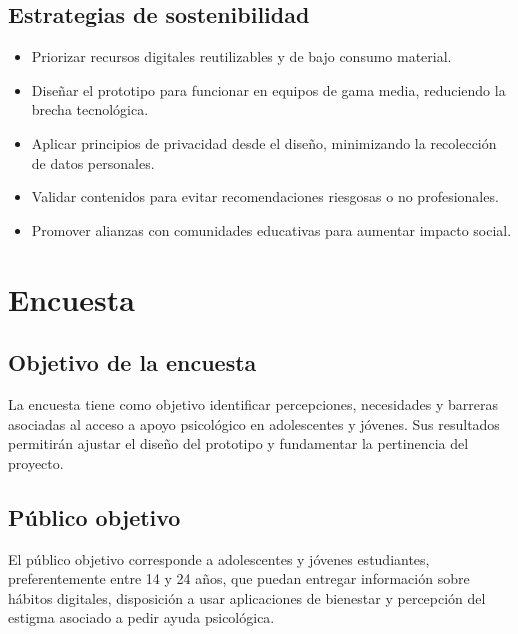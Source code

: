 \documentclass[12pt,letterpaper]{article}
\begin{document}
\subsection{Estrategias de sostenibilidad}
\begin{itemize}[leftmargin=*]
    \item Priorizar recursos digitales reutilizables y de bajo consumo material.
    \item Diseñar el prototipo para funcionar en equipos de gama media, reduciendo la brecha tecnológica.
    \item Aplicar principios de privacidad desde el diseño, minimizando la recolección de datos personales.
    \item Validar contenidos para evitar recomendaciones riesgosas o no profesionales.
    \item Promover alianzas con comunidades educativas para aumentar impacto social.
\end{itemize}

\section{Encuesta}

\subsection{Objetivo de la encuesta}
La encuesta tiene como objetivo identificar percepciones, necesidades y barreras asociadas al acceso a apoyo psicológico en adolescentes y jóvenes. Sus resultados permitirán ajustar el diseño del prototipo y fundamentar la pertinencia del proyecto.

\subsection{Público objetivo}
El público objetivo corresponde a adolescentes y jóvenes estudiantes, preferentemente entre 14 y 24 años, que puedan entregar información sobre hábitos digitales, disposición a usar aplicaciones de bienestar y percepción del estigma asociado a pedir ayuda psicológica.
\end{document}

